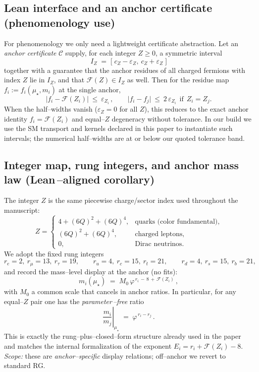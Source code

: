 \documentclass[epjc3]{svjour3}
\begin{document}
\subsection*{Lean interface and an anchor certificate (phenomenology use)}
For phenomenology we only need a lightweight certificate abstraction. Let an \emph{anchor certificate} $\mathcal C$ supply, for each integer $Z\ge0$, a symmetric interval
\[
I_Z \;=\; \bigl[\;c_Z-\varepsilon_Z,\ c_Z+\varepsilon_Z\;\bigr]
\]
together with a guarantee that the anchor residues of all charged fermions with index $Z$ lie in $I_Z$, and that $\mathcal F(Z)\in I_Z$ as well. Then for the residue map $f_i:=f_i(\mu_\star,m_i)$ at the single anchor,
\[
\boxed{\ \ \lvert f_i-\mathcal F(Z_i)\rvert\ \le\ \varepsilon_{Z_i}\,,\qquad
\lvert f_i-f_j\rvert\ \le\ 2\,\varepsilon_{Z_i}\ \ \text{if}\ \ Z_i=Z_j.\ \ }
\]
When the half–widths vanish ($\varepsilon_Z=0$ for all $Z$), this reduces to the exact anchor identity $f_i=\mathcal F(Z_i)$ and equal–$Z$ degeneracy without tolerance. In our build we use the SM transport and kernels declared in this paper to instantiate such intervals; the numerical half–widths are at or below our quoted tolerance band.

\subsection*{Integer map, rung integers, and anchor mass law (Lean\,–aligned corollary)}
The integer $Z$ is the same piecewise charge/sector index used throughout the manuscript:
\[
Z=\begin{cases}
4+(6Q)^2+(6Q)^4,& \text{quarks (color fundamental)},\\[2pt]
(6Q)^2+(6Q)^4,& \text{charged leptons},\\[2pt]
0,& \text{Dirac neutrinos}.
\end{cases}
\]
We adopt the fixed rung integers
\[
 r_e=2,\ r_\mu=13,\ r_\tau=19,\qquad
 r_u=4,\ r_c=15,\ r_t=21,\qquad
 r_d=4,\ r_s=15,\ r_b=21,
\]
and record the mass–level display at the anchor (no fits):
\[
\boxed{\ \ m_i(\mu_\star)\;=\;M_0\,\varphi^{\,r_i\,-\,8\,+\,\mathcal F(Z_i)}\,,\ \ }
\]
with $M_0$ a common scale that cancels in anchor ratios. In particular, for any equal–$Z$ pair one has the \emph{parameter\,–free} ratio
\[
\left.\frac{m_i}{m_j}\right|_{\mu_\star} \;=\; \varphi^{\,r_i-r_j}\,.
\]
This is exactly the rung–plus–closed–form structure already used in the paper and matches the internal formalization of the exponent $E_i=r_i+\mathcal F(Z_i)-8$. \emph{Scope:} these are \emph{anchor–specific} display relations; off–anchor we revert to standard RG. %
\end{document}
